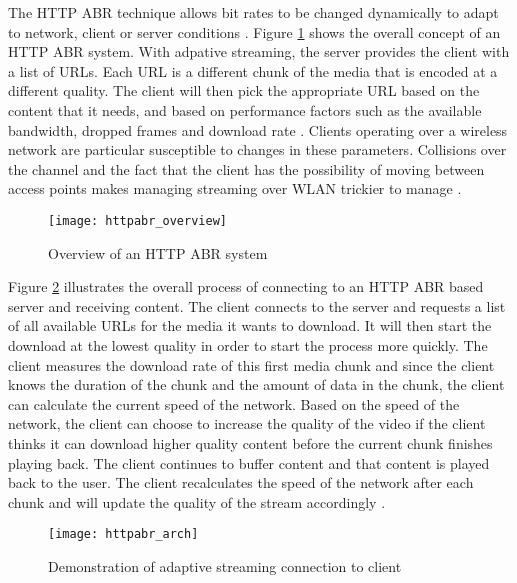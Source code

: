 \documentclass[12pt]{article}
\begin{document}
The HTTP ABR technique allows bit rates to be changed dynamically to adapt to network, client or server conditions \cite{7380453}.  Figure \ref{fig:httpabr_overview} shows the overall concept of an HTTP ABR system. With adpative streaming, the server provides the client with a list of URLs.  Each URL is a different chunk of the media that is encoded at a different quality.  The client will then pick the appropriate URL based on the content that it needs, and based on performance factors such as the available bandwidth, dropped frames and download rate \cite{httpabrtutorial}\cite{7057917}. Clients operating over a wireless network are particular susceptible to changes in these parameters.  Collisions over the channel and the fact that the client has the possibility of moving between access points makes managing streaming over WLAN trickier to manage \cite{10204452020150501}.

\begin{figure}[h]
  \begin{center}
    \texttt{[image: httpabr\_overview]}
    \caption{Overview of an HTTP ABR system}
    \label{fig:httpabr_overview}
  \end{center}
\end{figure}

Figure \ref{fig:httpabr_arch} illustrates the overall process of connecting to an HTTP ABR based server and receiving content.  The client connects to the server and requests a list of all available URLs for the media it wants to download.  It will then start the download at the lowest quality in order to start the process more quickly.  The client measures the download rate of this first media chunk and since the client knows the duration
of the chunk and the amount of data in the chunk, the client can calculate the current speed of the network. Based on the speed of the network, the client can choose to increase the quality of the video if the client thinks it can download higher quality content before the current chunk finishes playing back. The client continues to buffer content and that content is played back to the user.  The client recalculates the speed of the network after each chunk and will update the quality of the stream accordingly \cite{5986186}.

\begin{figure}[h]
  \begin{center}
    \texttt{[image: httpabr\_arch]}
    \caption{Demonstration of adaptive streaming connection to client}
    \label{fig:httpabr_arch}
  \end{center}
\end{figure}
\end{document}
